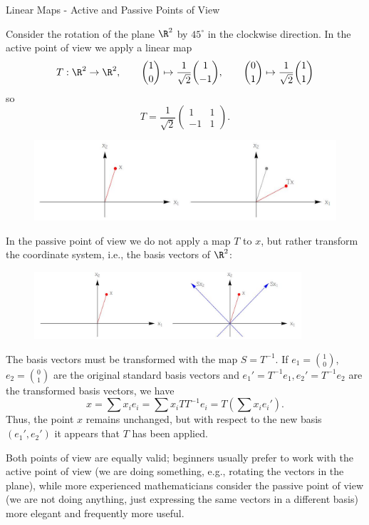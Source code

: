\documentclass[smaller,hyperref={CJKbookmarks=true}]{beamer}
\begin{document}
\begin{frame}{Linear Maps - Active and Passive Points of View}
\begin{spacing}{0.8}
Consider the rotation of the plane $\R^2$ by $45^{\circ}$ in the clockwise direction. In the \textcolor[rgb]{1.00,0.00,0.00}{active} point of view we apply a linear map
\[T:\R^2\to\R^2,\qquad \binom{1}{0}\mapsto\frac{1}{\sqrt{2}}\binom{1}{-1},\qquad \binom{0}{1}\mapsto\frac{1}{\sqrt{2}}\binom{1}{1}\]
so
\[T=\frac{1}{\sqrt{2}}\begin{pmatrix}
                        1 & 1 \\
                        -1 & 1
                      \end{pmatrix}.\]
\begin{figure}
  \centering
  \includegraphics[width=\textwidth]{28.jpg}

\end{figure}
\newpage
In the \textcolor[rgb]{1.00,0.00,0.00}{passive} point of view we do not apply a map $T$ to $x$, but rather transform the coordinate system, i.e., the basis vectors of $\R^2$:
\begin{figure}
  \centering
  \includegraphics[width=\textwidth,height=2.5cm]{29.jpg}

\end{figure}
The basis vectors must be transformed with the map $S=T^{-1}$. If $e_1=\binom{1}{0}$,\\ $e_2=\binom{0}{1}$ are the original standard basis vectors and $e_1'=T^{-1}e_1,e_2'=T^{-1}e_2$ are the transformed basis vectors, we have
\[x=\sum x_ie_i=\sum x_iTT^{-1}e_i=T\left(\sum x_ie_i'\right).\]
Thus, the point $x$ remains unchanged, but with respect to the new basis $(e_1',e_2')$ it appears that $T$ has been applied.
\end{spacing}
\newpage
\begin{spacing}{1.1}
Both points of view are equally valid; beginners usually prefer to work with
the active point of view (we are \textcolor[rgb]{1.00,0.00,0.00}{doing something}, e.g., rotating the vectors
in the plane), while more experienced mathematicians consider the passive
point of view (we are \textcolor[rgb]{1.00,0.00,0.00}{not doing anything}, just expressing the same vectors in a dif{}ferent basis) more elegant and frequently more useful.
\end{spacing}
\end{frame}
\end{document}

